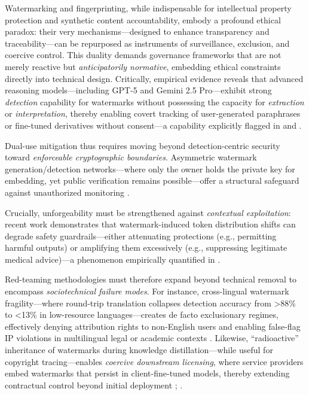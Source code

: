 \documentclass[11pt,a4paper]{article}
\begin{document}
Watermarking and fingerprinting, while indispensable for intellectual property protection and synthetic content accountability, embody a profound ethical paradox: their very mechanisms---designed to enhance transparency and traceability---can be repurposed as instruments of surveillance, exclusion, and coercive control. This duality demands governance frameworks that are not merely reactive but \emph{anticipatorily normative}, embedding ethical constraints directly into technical design. Critically, empirical evidence reveals that advanced reasoning models---including GPT-5 and Gemini 2.5 Pro---exhibit strong \emph{detection} capability for watermarks without possessing the capacity for \emph{extraction} or \emph{interpretation}, thereby enabling covert tracking of user-generated paraphrases or fine-tuned derivatives without consent---a capability explicitly flagged in \cite{doi:10.1145/1161366.1161397} and \cite{arxiv:2402.06922}.

Dual-use mitigation thus requires moving beyond detection-centric security toward \emph{enforceable cryptographic boundaries}. Asymmetric watermark generation/detection networks---where only the owner holds the private key for embedding, yet public verification remains possible---offer a structural safeguard against unauthorized monitoring \cite{arxiv:2402.16187}.

Crucially, unforgeability must be strengthened against \emph{contextual exploitation}: recent work demonstrates that watermark-induced token distribution shifts can degrade safety guardrails---either attenuating protections (e.g., permitting harmful outputs) or amplifying them excessively (e.g., suppressing legitimate medical advice)---a phenomenon empirically quantified in \cite{arxiv:2403.19548}.

Red-teaming methodologies must therefore expand beyond technical removal to encompass \emph{sociotechnical failure modes}. For instance, cross-lingual watermark fragility---where round-trip translation collapses detection accuracy from >88\% to <13\% in low-resource languages---creates de facto exclusionary regimes, effectively denying attribution rights to non-English users and enabling false-flag IP violations in multilingual legal or academic contexts \cite{arxiv:2402.14007}. Likewise, ``radioactive'' inheritance of watermarks during knowledge distillation---while useful for copyright tracing---enables \emph{coercive downstream licensing}, where service providers embed watermarks that persist in client-fine-tuned models, thereby extending contractual control beyond initial deployment \cite{arxiv:2402.19361}; \cite{doi:10.1145/3639477.3639720}.
\end{document}
